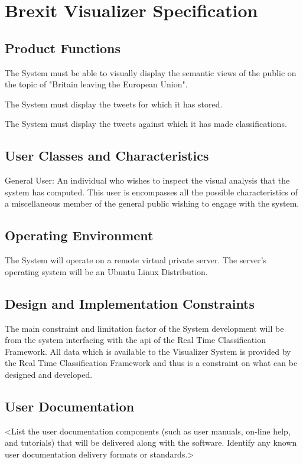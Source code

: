 \documentclass[11pt]{report}
\begin{document}
\section*{Brexit Visualizer Specification}
\subsection*{Product Functions}
The System must be able to visually display the semantic views of the public on the topic of "Britain leaving the European Union".

The System must display the tweets for which it has stored.

The System must display the tweets against which it has made classifications.
\subsection*{User Classes and Characteristics}

General User: An individual who wishes to inspect the visual analysis that the system has computed. This user is encompasses all the possible characteristics of a miscellaneous member of the general public wishing to engage with the system.

\subsection*{Operating Environment}
The System will operate on a remote virtual private server. The server’s operating system will be an Ubuntu Linux Distribution. 

\subsection*{Design and Implementation Constraints}
The main constraint and limitation factor of the System development will be from the system interfacing with the api of the Real Time Classification Framework. All data which is available to the Visualizer System is provided by the Real Time Classification Framework and thus is a constraint on what can be designed and developed.

\subsection*{User Documentation}
<List the user documentation components (such as user manuals, on-line help, and tutorials) that will be delivered along with the software. Identify any known user documentation delivery formats or standards.>
\end{document}
